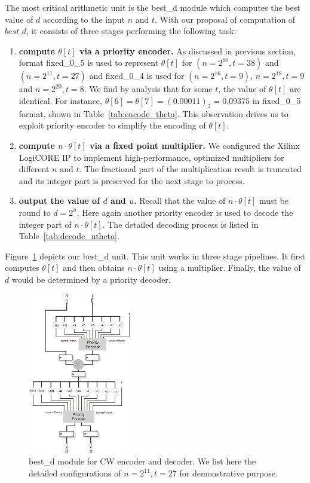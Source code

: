 \documentclass[10pt,journal,compsoc]{IEEEtran}
\begin{document}
The most critical arithmetic unit is the best\_d module which computes the best value of $d$ according to the input $n$ and $t$.
With our proposal of computation of $best\_d$, it consists of three stages performing the following task:
\begin{enumerate}
\item \textbf{compute $\theta[t]$ via a priority encoder.} As discussed in previous section, format fixed\_0\_5 is used to represent $\theta[t]$ for
$(n=2^{10},t=38)$ and $(n={2^{11},t=27})$ and fixed\_0\_4 is used for $(n=2^{16},t=9)$, $n={2^{18},t=9}$ and $n={2^{20},t=8}$. We find by analysis
that for some $t$, the value of $\theta[t]$ are identical. For instance, $\theta[6]=\theta[7]=(0.00011)_2=0.09375$ in fixed\_0\_5 format, shown in
Table~\ref{tab:encode_theta}. This observation drives us to exploit priority encoder to simplify the encoding of $\theta[t]$.

\item \textbf{compute $n\cdot \theta[t]$ via a fixed point multiplier.} We configured the Xilinx LogiCORE IP to implement high-performance,
optimized multipliers for different $n$ and $t$. The fractional part of the multiplication result is truncated and its integer part is
preserved for the next stage to process.

\item \textbf{output the value of $d$ and $u$.} Recall that the value of $n\cdot \theta[t]$ must be round to $d=2^u$. Here again another
priority encoder is used to decode the integer part of $n\cdot \theta[t]$. The detailed decoding process is listed in Table~\ref{tab:decode_ntheta}.
\end{enumerate}

Figure~\ref{fig:best_d} depicts our best\_d unit. This unit works in three stage pipelines. It first computes $\theta[t]$ and
then obtains $n\cdot\theta[t]$ using a multiplier. Finally, the value of $d$ would be determined by a priority decoder.
\begin{figure}[!htb]\centering
   \includegraphics[width=0.40\textwidth]{./fig/best_d.eps}
   \caption{best\_d module for CW encoder and decoder. We list here the detailed configurations of $n=2^{11},t=27$ for demonstrative purpose.}
    \label{fig:best_d}
\end{figure}
\end{document}

